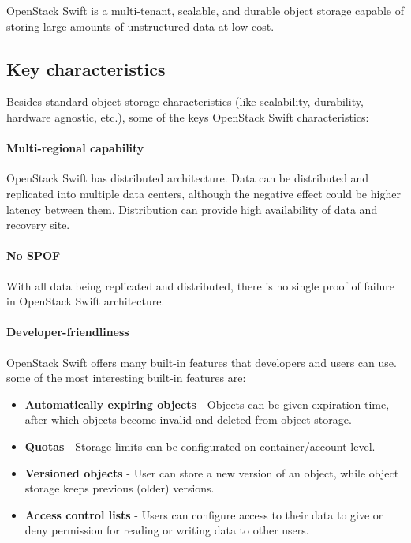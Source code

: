     OpenStack Swift is a multi-tenant, scalable, and durable object storage capable of storing large amounts of unstructured data at low cost\cite{swiftOpenStackSwift}.

    \subsection{Key characteristics}
    Besides standard object storage characteristics (like scalability, durability, hardware agnostic, etc.), some of the keys OpenStack Swift characteristics:

    \paragraph{Multi-regional capability}
    OpenStack Swift has distributed architecture. Data can be distributed and replicated into multiple data centers, although the negative effect could be higher latency between them. Distribution can provide high availability of data and recovery site\cite{swiftOpenStackSwift}.

    \paragraph{No SPOF}
    With all data being replicated and distributed, there is no single proof of failure in OpenStack Swift architecture.

    \paragraph{Developer-friendliness}
    OpenStack Swift offers many built-in features that developers and users can use. some of the most interesting built-in features are\cite{swiftOpenStackSwift}:
    \begin{itemize}
        \item \textbf{Automatically expiring objects} - Objects can be given expiration time, after which objects become invalid and deleted from object storage.
        \item \textbf{Quotas} - Storage limits can be configurated on container/account level.
        \item \textbf{Versioned objects} - User can store a new version of an object, while object storage keeps previous (older) versions.
        \item \textbf{Access control lists} - Users can configure access to their data to give or deny permission for reading or writing data to other users.
    \end{itemize}

